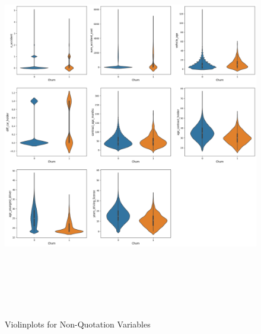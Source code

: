 \documentclass[12pt,titlepage]{article}
\begin{document}
\begin{figure}[H]
    \centerline{\includegraphics[height=17cm]{violin2.png}}
\caption{Violinplots for Non-Quotation Variables}
\label{fig:edanq}
\end{figure}
\end{document}
